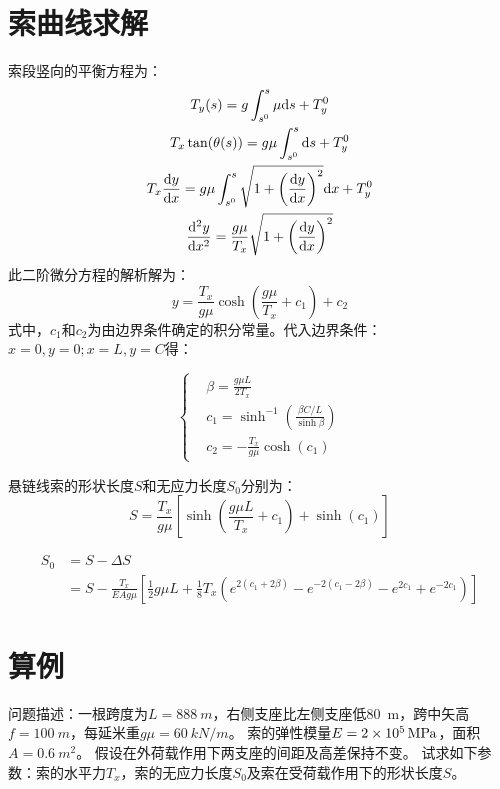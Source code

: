 \documentclass{article}
\begin{document}
\section{索曲线求解}
索段竖向的平衡方程为：
\begin{gather}
  T_y(s) = g \int_{s^0}^{s} \mu \mathrm{d}s + T_y^0 \notag \\
  T_x \tan(\theta(s)) = g \mu \int_{s^0}^{s} \mathrm{d}s + T_y^0 \notag \\
  T_x \frac{\mathrm{d} y}{\mathrm{d} x} = g \mu \int_{s^0}^{s} \sqrt{1+\left(\frac{\mathrm{d} y}{\mathrm{d} x}\right)^2} \mathrm{d}x + T_y^0 \notag \\
  \frac{\mathrm{d}^2 y}{\mathrm{d} x^2} = \frac{g \mu}{T_x} \sqrt{1+\left(\frac{\mathrm{d} y}{\mathrm{d} x}\right)^2}
\end{gather}
此二阶微分方程的解析解为：
\begin{equation}
  y = \frac{T_x}{g \mu} \cosh \left( \frac{g \mu}{T_x} + c_1 \right)+c_2
\end{equation}
式中，$c_1$和$c_2$为由边界条件确定的积分常量。代入边界条件：$x=0,y=0;x=L,y=C$得：

\begin{equation}
  \left \{
    \begin{split}
      & \beta = \frac{g \mu L}{2 T_x}\\
      & c_1 = \sinh^{-1}\left(\frac{\beta C / L}{\sinh \beta}\right)\\
      & c_2 = -\frac{T_x}{g \mu} \cosh(c_1)
    \end{split}
  \right.
\end{equation}

悬链线索的形状长度$S$和无应力长度$S_0$分别为：
\begin{equation}
  S = \frac{T_x}{g\mu}\left[\sinh\left(\frac{g \mu L}{T_x}+c_1\right)+\sinh(c_1)\right]
\end{equation}

\begin{equation}
\begin{split}
  S_0 &= S-\Delta S \\
      &= S - \frac{T_x}{EA g \mu }\left[ \frac{1}{2} g \mu L + \frac{1}{8} T_x \left( e^{2(c_1+2\beta)} - e^{-2(c_1-2\beta)} -e^{2c_1} + e^{-2c_1} \right) \right]
\end{split}
\end{equation}
\section{算例}
问题描述：一根跨度为$L=\SI{888}{m}$，右侧支座比左侧支座低\SI{80}{m}，跨中矢高$f=\SI{100}{m}$，每延米重$g \mu=\SI{60}{kN/m}$。
索的弹性模量$E=\SI{2E5}{MPa}$，面积$A=\SI{0.6}{m^2}$。
假设在外荷载作用下两支座的间距及高差保持不变。
试求如下参数：索的水平力$T_x$，索的无应力长度$S_0$及索在受荷载作用下的形状长度$S$。
\end{document}
